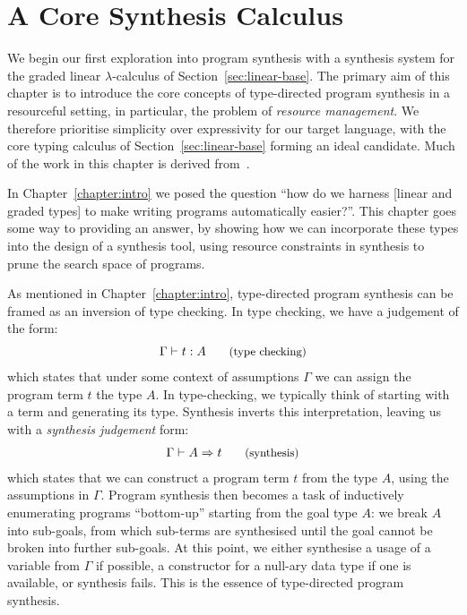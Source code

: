 \chapter{A Core Synthesis Calculus}
\label{chapter:core}
We begin our first exploration into program synthesis with a synthesis system for the
graded linear $\lambda$-calculus of Section~\ref{sec:linear-base}. %
The primary aim of this chapter is to introduce the core concepts of
type-directed program synthesis in a resourceful setting, in particular, the
problem of \textit{resource management}. We therefore prioritise simplicity over
expressivity for our target language, with the core typing calculus of
Section~\ref{sec:linear-base} forming an ideal candidate. Much of the work in
this chapter is derived from~\citet{DBLP:conf/lopstr/HughesO20}. 

In Chapter~\ref{chapter:intro} we posed the question ``how do we harness [linear
and graded types] to make writing programs automatically easier?''. This chapter
goes some way to providing an answer, by showing how we can  
incorporate these types into the design of a synthesis tool, using resource
constraints in synthesis to prune the search space of programs. 

As mentioned in Chapter~\ref{chapter:intro}, type-directed program synthesis can
be framed as an inversion of type checking. In type checking, we have a
judgement of the form: 
\begin{align*}
    \Gamma \vdash t : A {\small{\tag{type checking}}}
\end{align*}
which states that under some context of assumptions $\Gamma$ we can assign the
program term $t$ the type $A$. 
In type-checking, we typically think of starting with a term and 
generating its type. Synthesis inverts this interpretation, leaving us
with a \textit{synthesis judgement} form:
\begin{align*}
    \Gamma \vdash A \Rightarrow t {\small{\tag{synthesis}}}
\end{align*}
which states that we can construct a program term $t$ from the type $A$, using
the assumptions in $\Gamma$. Program synthesis then becomes a task of
inductively enumerating programs ``bottom-up'' starting from the goal type $A$:
we break $A$ into sub-goals, from which sub-terms are synthesised until the goal
cannot be broken into further sub-goals. At this point, we either synthesise a
usage of a variable from $\Gamma$ if possible, a constructor for a null-ary data
type if one is available, or synthesis fails. This is the essence of type-directed program
synthesis. 

